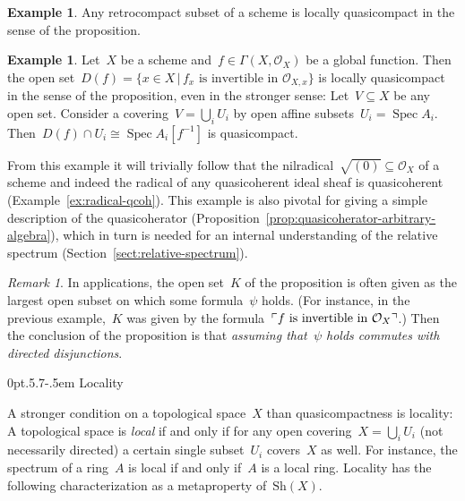 \documentclass[10pt,reqno,a4paper]{amsbook}
\makeatletter
\theoremstyle{definition}
\newtheorem{ex}[defn]{Example}
\theoremstyle{plain}
\theoremstyle{remark}
\newtheorem{rem}[defn]{Remark}
\renewcommand{\O}{\mathcal{O}}
\newcommand{\Sh}{\mathrm{Sh}}
\DeclareMathOperator{\Spec}{Spec}
\newcommand{\?}{\,{:}\,}
\renewcommand{\_}{\mathpunct{.}\,}
\newcommand{\speak}[1]{\ulcorner\text{\textnormal{#1}}\urcorner}
\def\subsection{\@startsection{subsection}{2}%
  {0pt}{.5\linespacing\@plus.7\linespacing}{-.5em}%
  {\normalfont\bfseries}}
\makeatother
\begin{document}
\begin{ex}Any retrocompact subset of a scheme is locally quasicompact in the
sense of the proposition.\end{ex}

\begin{ex}\label{ex:df-locally-compact}
Let~$X$ be a scheme and~$f \in \Gamma(X,\O_X)$ be a global function.
Then the open set~$D(f) = \{ x \in X \,|\, \text{$f_x$ is invertible in~$\O_{X,x}$}
\}$ is locally quasicompact in the sense of the proposition, even in the
stronger sense: Let~$V \subseteq X$ be any open set. Consider a covering~$V = \bigcup_i
U_i$ by open affine subsets~$U_i = \Spec A_i$. Then~$D(f) \cap U_i \cong \Spec
A_i[f^{-1}]$ is quasicompact.\end{ex}

From this example it will trivially follow that the nilradical~$\sqrt{(0)}
\subseteq \O_X$ of a scheme and indeed the radical of any quasicoherent ideal
sheaf is quasicoherent (Example~\ref{ex:radical-qcoh}). This example is also
pivotal for giving a simple description of the quasicoherator
(Proposition~\ref{prop:quasicoherator-arbitrary-algebra}), which in turn is
needed for an internal understanding of the relative
spectrum (Section~\ref{sect:relative-spectrum}).

\begin{rem}In applications, the open set~$K$ of the proposition is often given
as the largest open subset on which some formula~$\psi$ holds. (For instance,
in the previous example,~$K$ was given by the formula~$\speak{$f$
is invertible in $\O_X$}$.)
Then the conclusion of the proposition is that \emph{assuming that~$\psi$ holds commutes
with directed disjunctions}.\end{rem}


\subsection{Locality}

A stronger condition on a topological space~$X$ than quasicompactness is
locality: A topological space is \emph{local} if and only if for any open
covering~$X = \bigcup_i U_i$ (not necessarily directed) a certain single subset~$U_i$
covers~$X$ as well. For instance, the spectrum of a ring~$A$ is local if and only
if~$A$ is a local ring. Locality has the following characterization as a metaproperty
of~$\Sh(X)$.
\end{document}
